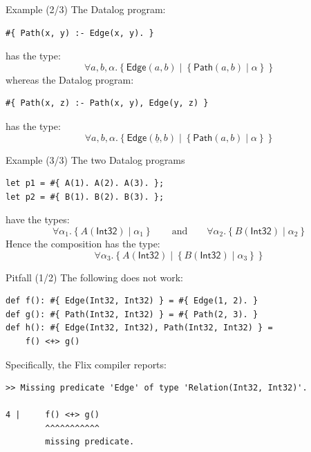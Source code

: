 \begin{frame}[fragile]{Example (2/3)}
The Datalog program:
%
\begin{lstlisting}[language=flix, xleftmargin=0.8cm]
#{ Path(x, y) :- Edge(x, y). }
\end{lstlisting}    
%
has the type:
%
\[
\forall a, b, \alpha. \left\{ \textsf{Edge}(a, b) \mid \left\{ \textsf{Path}(a, b) \mid \alpha \right\} \right\}
\]
%
whereas the Datalog program:
%
\begin{lstlisting}[language=flix, xleftmargin=0.8cm]
#{ Path(x, z) :- Path(x, y), Edge(y, z) }
\end{lstlisting}    
%
has the type:
%
\[
\forall a, b, \alpha. \left\{ \textsf{Edge}(\underline{b}, b) \mid \left\{ \textsf{Path}(a, b) \mid \alpha \right\} \right\}
\]
%
\end{frame}

\begin{frame}[fragile]{Example (3/3)}
The two Datalog programs
%
\begin{lstlisting}[language=flix, xleftmargin=0.8cm]
let p1 = #{ A(1). A(2). A(3). };
let p2 = #{ B(1). B(2). B(3). };
\end{lstlisting}    
%
have the types:
%
\[
\forall \alpha_1. \left\{ A(\textsf{Int32}) \mid \alpha_1 \right\}
\qquad \text{and} \qquad
\forall \alpha_2. \left\{ B(\textsf{Int32}) \mid \alpha_2 \right\}
\]
%
Hence the composition  has the type:
%
\[
\forall \alpha_3. \left\{ A(\textsf{Int32}) \mid \left\{ B(\textsf{Int32}) \mid \alpha_3 \right\} \right\}
\]
%
\end{frame}

\begin{frame}[fragile]{Pitfall (1/2)}
The following does not work: 

\begin{lstlisting}[language=flix, xleftmargin=0.8cm]
def f(): #{ Edge(Int32, Int32) } = #{ Edge(1, 2). }
def g(): #{ Path(Int32, Int32) } = #{ Path(2, 3). }
def h(): #{ Edge(Int32, Int32), Path(Int32, Int32) } = 
    f() <+> g()
\end{lstlisting}

Specifically, the Flix compiler reports:

\begin{lstlisting}[language=flix, xleftmargin=0.8cm]
>> Missing predicate 'Edge' of type 'Relation(Int32, Int32)'.

4 |     f() <+> g()
        ^^^^^^^^^^^
        missing predicate.
\end{lstlisting}
\end{frame}

